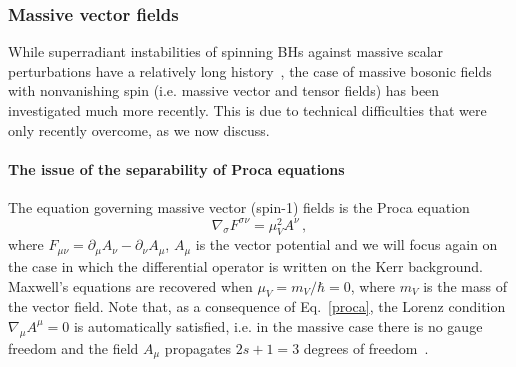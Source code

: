 \documentclass[11pt]{article}
\numberwithin{equation}{section} %
\begin{document}
\subsubsection{Massive vector fields}\label{ref:proca}

While superradiant instabilities of spinning BHs against massive scalar perturbations have a relatively long 
history~\cite{Press:1972zz,Damour:1976kh,Cardoso:2004nk,Cardoso:2005vk,Dolan:2007mj,Rosa:2009ei,Cardoso:2011xi}, the 
case of massive bosonic fields with nonvanishing spin (i.e. massive vector and tensor fields) has been investigated much 
more recently. This is due to technical difficulties that were only recently overcome, as we now discuss.

\paragraph{The issue of the separability of Proca equations}

The equation governing massive vector (spin-1) fields is the Proca equation
\begin{equation}
\nabla_\sigma F^{\sigma\nu}=\mu_V^2 A^\nu\,,\label{proca}
\end{equation}
where $F_{\mu\nu}=\partial_\mu A_\nu-\partial_\nu A_\mu$, $A_\mu$
is the vector potential and we will focus again on the case in which the differential operator is written on the Kerr 
background. 
Maxwell's equations are recovered when
$\mu_V=m_V/\hbar=0$, where $m_V$ is the mass of the vector field.  Note
that, as a consequence of Eq.~\eqref{proca}, the Lorenz condition
$\nabla_\mu A^\mu=0$ is automatically satisfied, i.e. in the massive
case there is no gauge freedom and the field $A_\mu$ propagates
$2s+1=3$ degrees of freedom~\cite{Rosa:2011my}.
\end{document}
